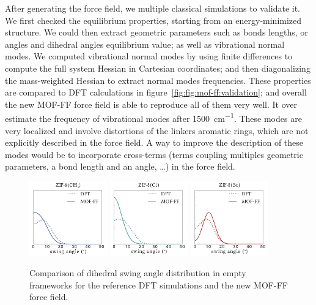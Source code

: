 \documentclass[thesis]{subfiles}
\begin{document}
After generating the force field, we multiple classical simulations to validate
it. We first checked the equilibrium properties, starting from an
energy-minimized structure. We could then extract geometric parameters such as
bonds lengths, or angles and dihedral angles equilibrium value; as well as
vibrational normal modes. We computed vibrational normal modes by using finite
differences to compute the full system Hessian in Cartesian coordinates; and
then diagonalizing the mass-weighted Hessian to extract normal modes
frequencies. These properties are compared to DFT calculations in
figure~\ref{fig:fig:mof-ff:validation}; and overall the new MOF-FF force field
is able to reproduce all of them very well. It over estimate the frequency of
vibrational modes after \SI{1500}{cm^{-1}}. These modes are very localized and
involve distortions of the linkers aromatic rings, which are not explicitly
described in the force field. A way to improve the description of these modes
would be to incorporate cross-terms (terms coupling multiples geometric
parameters, \ie a bond length and an angle, \dots) in the force field.

\begin{figure}[ht]
    \centering
    \includegraphics[width=0.3\textwidth]{figures/images/mof-ff-dihedrals-CH3}
    \includegraphics[width=0.3\textwidth]{figures/images/mof-ff-dihedrals-Cl}
    \includegraphics[width=0.3\textwidth]{figures/images/mof-ff-dihedrals-Br}
    \caption{Comparison of dihedral swing angle distribution in empty frameworks
    for the reference DFT simulations and the new MOF-FF force field.}
    \label{fig:fig:mof-ff:swing}
\end{figure}
\end{document}
